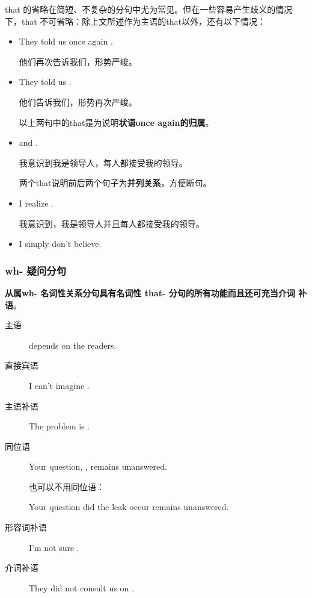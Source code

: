 that 的省略在简短、不复杂的分句中尤为常见。但在一些容易产生歧义的情况
下，that 不可省略：除上文所述作为主语的that以外，还有以下情况：
\begin{itemize}
\item  They told us once again .

  他们再次告诉我们，形势严峻。

\item They told us .

  他们告诉我们，形势再次严峻。

  以上两句中的that是为说明\textbf{状语once again的归属}。

\item {} and .

  我意识到我是领导人，每人都接受我的领导。

  两个that说明前后两个句子为\textbf{并列关系}，方便断句。

\item I realize .

  我意识到，我是领导人并且每人都接受我的领导。

\item {} I simply don't believe.

\end{itemize}

\subsubsection{wh- 疑问分句}


\textbf{从属wh- 名词性关系分句具有名词性 that- 分句的所有功能而且还可充当介词
  补语}。

\begin{description}
\item[主语]  depends on the readers.

\item[直接宾语] I can't imagine .

\item[主语补语] The problem is .

\item[同位语] Your question, , remains unanswered.

  也可以不用同位语：

  Your question  did the leak occur remains unanswered.

\item[形容词补语] I'm not sure .

\item[介词补语] They did not consult us on .
\end{description}

